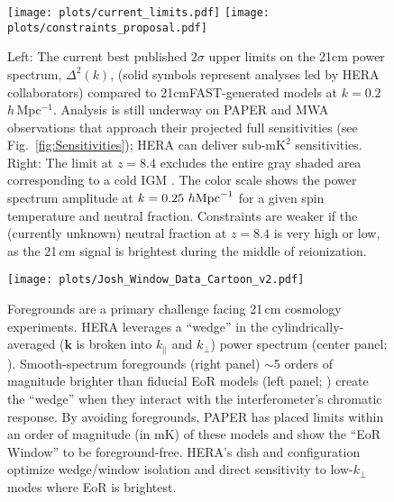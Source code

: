 \documentclass[preprint,11pt]{aastex}
\begin{document}
\begin{figure}[t]
	\centering
	\texttt{[image: plots/current\_limits.pdf]}
	\texttt{[image: plots/constraints\_proposal.pdf]}
	\vspace{-20pt}
	\caption{Left: The current best published $2\sigma$ upper limits on the 21cm power spectrum, $\Delta^2(k)$, (solid symbols represent analyses led by HERA collaborators) compared to 21cmFAST-generated models at $k=0.2$\,$h$\,Mpc$^{-1}$. 
Analysis is still underway on PAPER and MWA observations that approach their projected 
full sensitivities (see Fig.~\ref{fig:Sensitivities}); 
HERA can deliver sub-$\text{mK}^2$ sensitivities.
Right: The \citet{ali_et_al2015} limit at $z=8.4$ excludes the entire gray shaded area corresponding to a cold IGM \citep{pober_et_al2015}.  The color scale shows the power spectrum amplitude at $k = 0.25~h{\rm Mpc}^{-1}$ for a given spin temperature and neutral fraction.  Constraints are weaker if the (currently unknown) neutral fraction at $z=8.4$ is very high or low, as the 21\,cm signal is brightest during the middle of reionization.}
	\vspace{-10pt}
	\label{fig:limits}
	\label{fig:IGMtemperatureConstraints}
\end{figure}

\begin{figure}[t]
	\centering
	\vspace{-10pt}
	\texttt{[image: plots/Josh\_Window\_Data\_Cartoon\_v2.pdf]}
	\vspace{-25pt}
	\caption{Foregrounds are a primary challenge facing 21\,cm cosmology experiments. 
HERA leverages a ``wedge'' in the cylindrically-averaged ($\mathbf{k}$ is broken into $k_\|$ and $k_\perp$) power spectrum (center panel; \citealt{dillon_et_al2015}). Smooth-spectrum foregrounds (right panel) $\sim$5 orders of magnitude brighter than fiducial EoR models (left panel; \citealt{mesinger_et_al2011}) create the ``wedge'' when they interact with the interferometer's chromatic response. By avoiding foregrounds, PAPER has placed limits within an order
of magnitude (in mK) of these models \citep{ali_et_al2015} and show the ``EoR Window'' to be foreground-free.
HERA's dish and configuration optimize wedge/window isolation and direct sensitivity to low-$k_\perp$ modes where EoR is brightest.
}	\label{fig:wedge}
\vspace{-10pt}
\end{figure}
\end{document}
